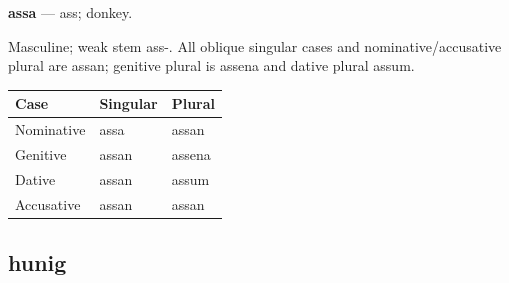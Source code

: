 \par\begin{minipage}{\linewidth}\raggedright
\textbf{assa} — ass; donkey.

Masculine; weak stem ass-. All oblique singular cases and nominative/\allowbreak{}accusative plural are assan; genitive plural is assena and dative plural assum.

\par\begingroup
\fontsize{10.5}{13.2}\selectfont
\setlength{\LTleft}{0pt}\setlength{\LTright}{\fill}
\noindent
\begin{tabular}{@{}>{\raggedright\arraybackslash}p{39.46mm}>{\raggedright\arraybackslash}p{39.46mm}>{\raggedright\arraybackslash}p{39.46mm}@{}}
\toprule
\textbf{Case} & \textbf{Singular} & \textbf{Plural} \\
\midrule
Nominative & assa & assan \\
Genitive & assan & assena \\
Dative & assan & assum \\
Accusative & assan & assan \\
\bottomrule
\end{tabular}
\par\endgroup

\end{minipage}\par
{}
\subsection*{hunig}

